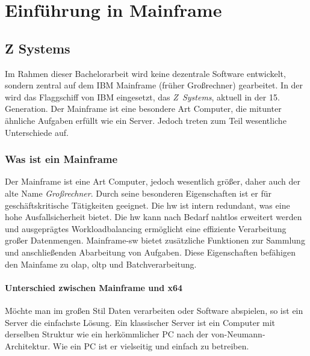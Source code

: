 \chapter{Einführung in Mainframe}

\section{Z Systems}
Im Rahmen dieser Bachelorarbeit wird keine dezentrale Software entwickelt, sondern zentral auf dem IBM Mainframe (früher Großrechner) gearbeitet.  In der \FirmenName wird das Flaggschiff von IBM eingesetzt, das \emph{Z~Systems}, aktuell in der 15. Generation. Der Mainframe ist eine besondere Art Computer, die mitunter ähnliche Aufgaben erfüllt wie ein Server. Jedoch treten zum Teil wesentliche Unterschiede auf.

\subsection{Was ist ein Mainframe}

Der Mainframe ist eine Art Computer, jedoch wesentlich größer, daher auch der alte Name \emph{Großrechner}. Durch seine besonderen Eigenschaften ist er für geschäftskritische Tätigkeiten geeignet. Die \ac{hw} ist intern redundant, was eine hohe Ausfallsicherheit bietet. Die \ac{hw} kann nach Bedarf nahtlos erweitert werden und ausgeprägtes Workloadbalancing ermöglicht eine effiziente Verarbeitung großer Datenmengen. Mainframe-\ac{sw} bietet zusätzliche Funktionen zur Sammlung und anschließenden Abarbeitung von Aufgaben. Diese Eigenschaften befähigen den Mainfame zu \ac{olap}, \ac{oltp} und Batchverarbeitung.


\subsubsection[Z Systems vs. x64]{Unterschied zwischen Mainframe und x64}

Möchte man im großen Stil Daten verarbeiten oder Software abspielen, so ist ein Server die einfachste Lösung. Ein klassischer Server ist ein Computer mit derselben Struktur wie ein herkömmlicher PC nach der \mbox{von-Neumann-Architektur}. Wie ein PC ist er vielseitig und einfach zu betreiben.

